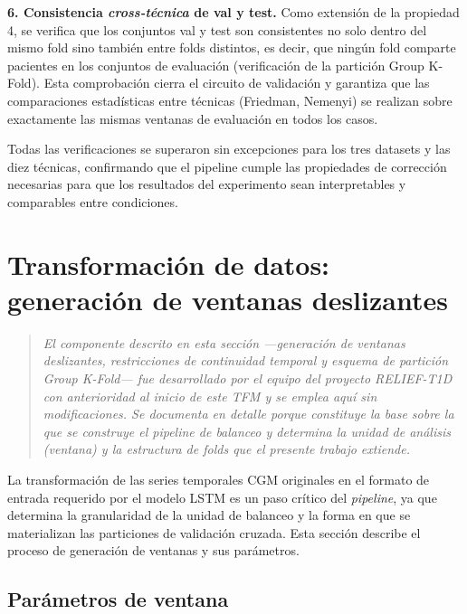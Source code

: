 \textbf{6. Consistencia \emph{cross-técnica} de val y test.} Como extensión de la propiedad 4, se verifica que los conjuntos val y test son consistentes no solo dentro del mismo fold sino también entre folds distintos, es decir, que ningún fold comparte pacientes en los conjuntos de evaluación (verificación de la partición Group K-Fold). Esta comprobación cierra el circuito de validación y garantiza que las comparaciones estadísticas entre técnicas (Friedman, Nemenyi) se realizan sobre exactamente las mismas ventanas de evaluación en todos los casos.

Todas las verificaciones se superaron sin excepciones para los tres datasets y las diez técnicas, confirmando que el pipeline cumple las propiedades de corrección necesarias para que los resultados del experimento sean interpretables y comparables entre condiciones.

\section{Transformación de datos: generación de ventanas deslizantes}
\label{sec:transformacion_ventanas}

\begin{quote}
\small\itshape
El componente descrito en esta sección ---generación de ventanas deslizantes,
restricciones de continuidad temporal y esquema de partición \emph{Group K-Fold}---
fue desarrollado por el equipo del proyecto RELIEF-T1D con anterioridad al inicio
de este TFM y se emplea aquí sin modificaciones. Se documenta en detalle porque
constituye la base sobre la que se construye el \textit{pipeline} de balanceo y
determina la unidad de análisis (ventana) y la estructura de folds que el presente
trabajo extiende.
\end{quote}

La transformación de las series temporales CGM originales en el formato de entrada
requerido por el modelo LSTM es un paso crítico del \emph{pipeline}, ya que determina
la granularidad de la unidad de balanceo y la forma en que se materializan las
particiones de validación cruzada. Esta sección describe el proceso de generación de
ventanas y sus parámetros.
\subsection{Parámetros de ventana}
\label{subsec:parametros_ventana}

